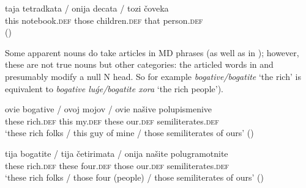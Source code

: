 \documentclass[output=paper]{langscibook}
\begin{document}
\ea
\gll \minsp{*} taja tetradkata / \minsp{*} onija decata / \minsp{*} tozi čoveka \\
{} this notebook.\textsc{def} { } {} those children.\textsc{def} { } {} that person.\textsc{def} \\  \hfill()
\z

\noindent Some apparent nouns do take articles in  MD phrases (as well as in ); however, these are not true nouns but other categories: the articled words in   and  presumably  modify a null N head. So for example \textit{bogative/bogatite} `the rich' is equivalent to \textit{bogative luǵe/bogatite xora} ‘the rich people’).


\ea \label{bogative}
\gll ovie bogative / ovoj mojov / ovie našive 	polupismenive \\
these rich.\textsc{def} { } this my.\textsc{def} { } these our.\textsc{def} semiliterates.\textsc{def} \\
\glt `these rich folks / this guy of mine / those semiliterates of ours'
\glt \hfill()
\z


\ea \label{bogatite}
\gll tija bogatite / tija četirimata / onija našite 	polugramotnite \\
these rich.\textsc{def} { } these four.\textsc{def} { } those our.\textsc{def} semiliterates.\textsc{def} \\
\glt `these rich folks / those four (people) / those semiliterates of ours'
\glt \hfill()
\z
\end{document}
